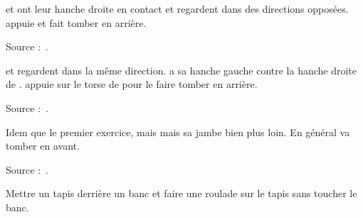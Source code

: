 \begin{exercice}
\A et \D ont leur hanche droite en contact et regardent dans des directions opposées.
\A appuie et fait tomber \D en arrière.

Source :~\cite{petit:dijon:close_longword:2015}.
\end{exercice}


\begin{exercice}
\A et \D regardent dans la même direction.
\A a sa hanche gauche contre la hanche droite de \D.
\A appuie sur le torse de \D pour le faire tomber en arrière.

Source :~\cite{petit:dijon:close_longword:2015}.
\end{exercice}


\begin{exercice}
Idem que le premier exercice, mais \A mais sa jambe bien plus loin.
En général \D va tomber en avant.

Source :~\cite{petit:dijon:close_longword:2015}.
\end{exercice}


\begin{exercice}
Mettre un tapis derrière un banc et faire une roulade sur le tapis sans toucher le banc.
\end{exercice}


